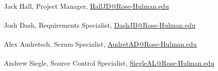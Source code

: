 \paragraph{} Jack Hall, Project Manager, \href{mailto:halljd@rose-hulman.edu}{HallJD@Rose-Hulman.edu}
\paragraph{} Josh Dash, Requirements Specialist, \href{mailto:dashjb@rose-hulman.edu}{DashJB@Rose-Hulman.edu}
\paragraph{} Alex Audretsch, Scrum Specialist, \href{mailto:audretad@rose-hulman.edu}{AudretAD@Rose-Hulman.edu}
\paragraph{}Andrew Siegle, Source Control Specialist, \href{mailto:siegleal@rose-hulman.edu}{SiegleAL@Rose-Hulman.edu}